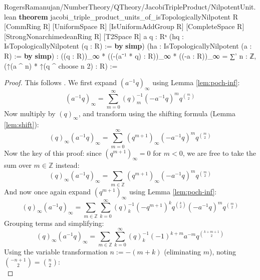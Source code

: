 \documentclass[12pt]{amsart}
\theoremstyle{definition}
\theoremstyle{remark}
\numberwithin{equation}{subsection}
\newcommand{\Z}{\mathbb Z}
\newcommand{\kw}[1]{\textcolor{keywordcolor}{\textbf{#1}}}
\newcommand{\var}[1]{\textcolor{tacticcolor}{#1}}
\newcommand{\num}[1]{\textcolor{numcolor}{#1}}
\newcommand{\imp}[1]{\textcolor{commentcolor}{\textbraceleft#1\textbraceright}}
\begin{document}
\begin{code}{RogersRamanujan/NumberTheory/QTheory/JacobiTripleProduct/NilpotentUnit.lean}
\kw{theorem} jacobi_triple_product_units_of_isTopologicallyNilpotent \imp{R} [CommRing \var{R}]
  [UniformSpace \var{R}] [IsUniformAddGroup \var{R}] [CompleteSpace \var{R}] [StrongNonarchimedeanRing \var{R}]
  [T2Space \var{R}]
  \imp{a q : Rˣ} (\var{hq} : IsTopologicallyNilpotent (\var{q} : \var{R}) := \kw{by} \kw{simp})
  (\var{ha} : IsTopologicallyNilpotent (\var{a} : \var{R}) := \kw{by} \kw{simp}) :
  ((\var{q} : \var{R}))_∞ * ((-(\var{a}⁻¹ * \var{q}) : \var{R}))_∞ * ((-\var{a} : \var{R}))_∞ =
  ∑' \var{n} : ℤ, (↑(\var{a} ^ \var{n}) * ↑(\var{q} ^ choose \var{n} \num{2}) : \var{R}) :=
\end{code}
\begin{proof}
    This follows \cite[Chapter 9]{Chan2009}. We first expand $(a^{-1}q)_\infty$ using Lemma \ref{lem:poch-inf}:
    \begin{equation}
        (a^{-1}q)_\infty = \sum_{m=0}^\infty (q)_m^{-1} (-a^{-1}q)^m q^{\binom{m}{2}}
    \end{equation}
    Now multiply by $(q)_\infty$, and transform using the shifting formula (Lemma \ref{lem:shift}):
    \begin{equation}
        (q)_\infty (a^{-1}q)_\infty = \sum_{m=0}^\infty (q^{m+1})_\infty (-a^{-1}q)^m q^{\binom{m}{2}}
    \end{equation}
    Now the key of this proof: since $(q^{m+1})_\infty = 0$ for $m < 0$, we are free to take the sum over $m \in \Z$ instead:
    \begin{equation}
        (q)_\infty (a^{-1}q)_\infty = \sum_{m \in \Z} (q^{m+1})_\infty (-a^{-1}q)^m q^{\binom{m}{2}}
    \end{equation}
    And now once again expand $(q^{m+1})_\infty$ using Lemma \ref{lem:poch-inf}:
    \begin{equation}
        (q)_\infty (a^{-1}q)_\infty = \sum_{m \in \Z} \sum_{k=0}^\infty (q)_k^{-1} (-q^{m+1})^k q^{\binom{k}{2}} (-a^{-1}q)^m q^{\binom{m}{2}}
    \end{equation}
    Grouping terms and simplifying:
    \begin{equation}
        (q)_\infty (a^{-1}q)_\infty = \sum_{m \in \Z} \sum_{k=0}^\infty (q)_k^{-1} (-1)^{k+m} a^{-m} q^{\binom{k+m+1}{2}}
    \end{equation}
    Using the variable transformation $n := -(m + k)$ (eliminating $m$), noting $\binom{-n+1}{2} = \binom{n}{2}$:
    \begin{equation}

\end{equation}
\end{proof}
\end{document}

